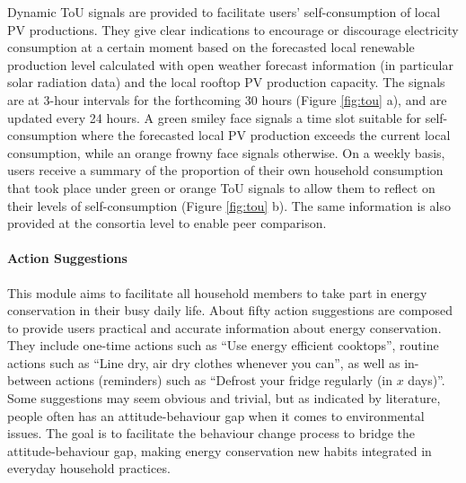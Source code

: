 
Dynamic ToU signals are provided to facilitate users' self-consumption of local PV productions.
They give clear indications to encourage or discourage electricity consumption at a certain moment based on the forecasted local renewable production level calculated with open weather forecast information (in particular solar radiation data) and the local rooftop PV production capacity. 
The signals are at 3-hour intervals for the forthcoming 30 hours (Figure \ref{fig:tou} a), and are updated every 24 hours. A green smiley face signals a time slot suitable for self-consumption where the forecasted local PV production exceeds the current local consumption, while an orange frowny face signals otherwise.  
% 
On a weekly basis, users receive a summary of the proportion of their own household consumption that took place under green or orange ToU signals to allow them to reflect on their levels of self-consumption (Figure \ref{fig:tou} b). The same information is also provided at the consortia level to enable peer comparison. 

\paragraph{Action Suggestions}

This module aims to %
facilitate all household members to take part in energy conservation in their busy daily life. 
% 
About fifty action suggestions are composed to provide users practical and accurate information about energy conservation. 
They include one-time actions such as ``Use energy efficient cooktops'', routine actions such as ``Line dry, air dry clothes whenever you can'', as well as in-between actions (reminders) such as ``Defrost your fridge regularly (in $x$ days)''. 
Some suggestions may seem obvious and trivial, but as indicated by literature, people often has an attitude-behaviour gap when it comes to environmental issues. The goal is to facilitate the behaviour change process to bridge the attitude-behaviour gap, making energy conservation new habits integrated in everyday household practices. 


